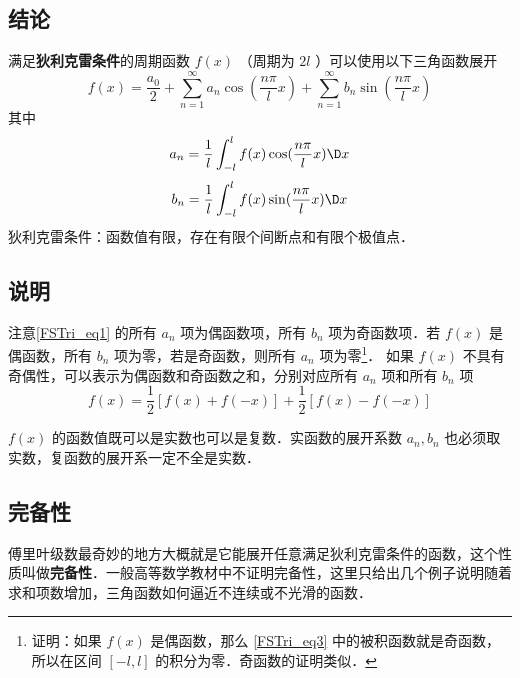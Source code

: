 


\subsection{结论}
满足\textbf{狄利克雷条件}的周期函数 $f(x)$ （周期为 $2l$ ）可以使用以下三角函数展开
\begin{equation}\label{FSTri_eq1}
f( x ) = \frac{{{a_0}}}{2} + \sum\limits_{n = 1}^\infty {{a_n}\cos (\frac{{n\pi }}{l}x) + } \sum\limits_{n = 1}^\infty {{b_n}\sin (\frac{{n\pi }}{l}x)}
\end{equation}
其中
\begin{equation}\label{FSTri_eq2}
{a_n} = \frac{1}{l}\int_{ - l}^l {f( x )\cos (\frac{{n\pi }}{l}x)\D x} 
\end{equation}
\begin{equation}\label{FSTri_eq3}
{b_n} = \frac{1}{l}\int_{ - l}^l {f( x )\sin (\frac{{n\pi }}{l}x)\D x}
\end{equation}
狄利克雷条件：函数值有限，存在有限个间断点和有限个极值点．

\subsection{说明}
注意\autoref{FSTri_eq1} 的所有 $a_n$ 项为偶函数项，所有 $b_n$ 项为奇函数项．若 $f(x)$ 是偶函数，所有 $b_n$ 项为零，若是奇函数，则所有 $a_n$ 项为零\footnote{证明：如果 $f(x)$ 是偶函数，那么 \autoref{FSTri_eq3} 中的被积函数就是奇函数，所以在区间 $[-l,l]$ 的积分为零．奇函数的证明类似．}． 如果 $f(x)$ 不具有奇偶性，可以表示为偶函数和奇函数之和，分别对应所有 $a_n$ 项和所有 $b_n$ 项
\begin{equation}
f(x) = \frac 12 [f(x)+f(-x)] + \frac 12 [f(x)-f(-x)]
\end{equation}

$f(x)$ 的函数值既可以是实数也可以是复数．实函数的展开系数 $a_n, b_n$ 也必须取实数，复函数的展开系一定不全是实数．

\subsection{完备性}
傅里叶级数最奇妙的地方大概就是它能展开任意满足狄利克雷条件的函数，这个性质叫做\textbf{完备性}．一般高等数学教材中不证明完备性，这里只给出几个例子说明随着求和项数增加，三角函数如何逼近不连续或不光滑的函数．

